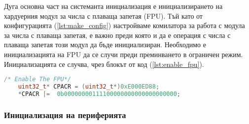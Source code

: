 Дуга основна част на системанта инициализация е инициализирането на хардуерния модул за числа с плаваща запетая (FPU).
Тъй като от конфигурацията (\autoref{lst:make_config}) настройваме комилатора за работа с модула за числа с плаваща запетая, е важно
преди която и да е операция с числа с плаваща запетая този модул да бъде инициализиран.
Необходимо е инициализацията на FPU да се случи преди преминването в ограничен режим.
Инициализацията се случва, чрез блокът от код (\autoref{lst:enable_fpu}).
\begin{lstlisting}[language=c, caption={Инициализация на модула за числа с плаваща запетая}, label={lst:enable_fpu}]
    /* Enable The FPU*/
    uint32_t* CPACR = (uint32_t*)0xE000ED88;
    *CPACR |=  0b00000000111100000000000000000000;
\end{lstlisting}

\subsubsection{Инициализация на периферията}





